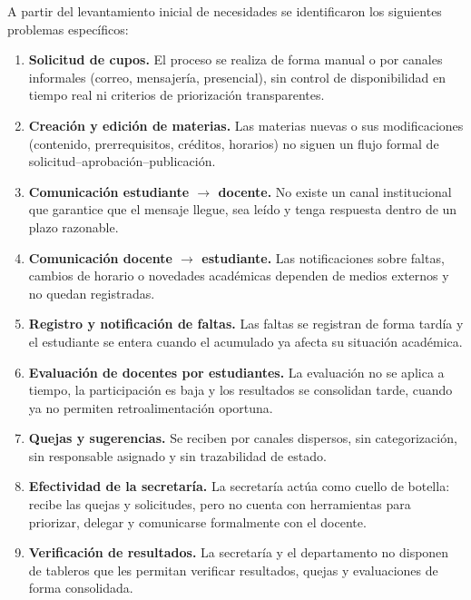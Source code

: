 A partir del levantamiento inicial de necesidades se identificaron los siguientes
problemas específicos:

\begin{enumerate}[leftmargin=1.4cm, itemsep=5pt]
  \item \textbf{Solicitud de cupos.} El proceso se realiza de forma manual o por
        canales informales (correo, mensajería, presencial), sin control de
        disponibilidad en tiempo real ni criterios de priorización transparentes.

  \item \textbf{Creación y edición de materias.} Las materias nuevas o sus
        modificaciones (contenido, prerrequisitos, créditos, horarios) no siguen
        un flujo formal de solicitud--aprobación--publicación.

  \item \textbf{Comunicación estudiante $\rightarrow$ docente.} No existe un canal
        institucional que garantice que el mensaje llegue, sea leído y tenga
        respuesta dentro de un plazo razonable.

  \item \textbf{Comunicación docente $\rightarrow$ estudiante.} Las notificaciones
        sobre faltas, cambios de horario o novedades académicas dependen de
        medios externos y no quedan registradas.

  \item \textbf{Registro y notificación de faltas.} Las faltas se registran de
        forma tardía y el estudiante se entera cuando el acumulado ya afecta su
        situación académica.

  \item \textbf{Evaluación de docentes por estudiantes.} La evaluación no se
        aplica a tiempo, la participación es baja y los resultados se consolidan
        tarde, cuando ya no permiten retroalimentación oportuna.

  \item \textbf{Quejas y sugerencias.} Se reciben por canales dispersos, sin
        categorización, sin responsable asignado y sin trazabilidad de estado.

  \item \textbf{Efectividad de la secretaría.} La secretaría actúa como cuello de
        botella: recibe las quejas y solicitudes, pero no cuenta con herramientas
        para priorizar, delegar y comunicarse formalmente con el docente.

  \item \textbf{Verificación de resultados.} La secretaría y el departamento no
        disponen de tableros que les permitan verificar resultados, quejas y
        evaluaciones de forma consolidada.


\end{enumerate}
